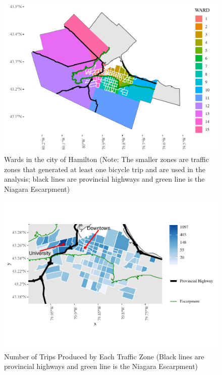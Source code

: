 \documentclass[smallextended]{svjour3}       %
\begin{document}
\begin{figure}
\centering
\includegraphics{BE-correlates-cycling-flows_files/figure-latex/context-plot-1.pdf}
\caption{\label{fig:context-plot} Wards in the city of Hamilton (Note:
The smaller zones are traffic zones that generated at least one bicycle
trip and are used in the analysis; black lines are provincial highways
and green line is the Niagara Escarpment)}
\end{figure}

\begin{figure}
\centering
\includegraphics{BE-correlates-cycling-flows_files/figure-latex/trips-by-origin-1.pdf}
\caption{\label{fig:trips-by-origin} Number of Trips Produced by Each
Traffic Zone (Black lines are provincial highways and green line is the
Niagara Escarpment)}
\end{figure}
\end{document}
